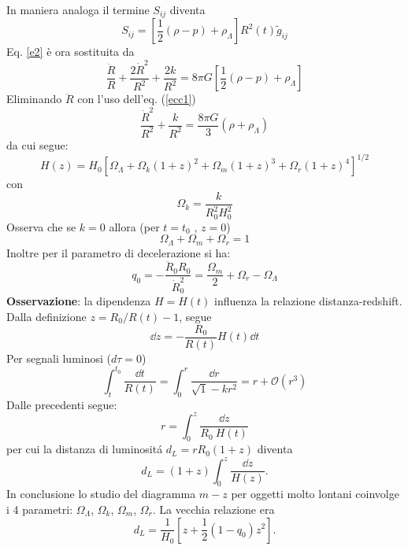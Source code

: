 In maniera analoga il termine $S_{ij}$ diventa
\begin{equation}
  S_{ij}= \left[ \frac {1}{2}(\rho-p)  + \rho_{\Lambda} \right] R^2(t) \tilde{g}_{ij}
  \label{sijcc}
\end{equation}
Eq. \eqref{e2}  è ora sostituita da
\begin{equation}
  \frac {\ddot{R}}{R}+\frac{2\dot{R}^2}{R^2}+\frac{2k}{R^2}=
  8 \pi G \left[ \frac{1}{2}(\rho-p) +\rho_{\Lambda} \right]
\end{equation}
Eliminando $\ddot R$ con l'uso dell'eq. (\ref{ecc1})
\begin{equation}
  \frac  {\dot{R}^2} {R^2} +\frac {k}{R^2} = \frac {8 \pi G}{3} (\rho+\rho_{\Lambda})
\end{equation}
da cui segue:
\begin{equation}
  H(z)=H_0 \left[\Omega_{\Lambda}+\Omega_{k}(1+z)^2+\Omega_m (1+z)^3+\Omega_r (1+z)^4\right]^{1/2}
  \label{hzcc}
\end{equation}
con
\begin{equation}
  \Omega_k = \frac {k}{R_0^2 H_0^2}
\end{equation}
Osserva che se $k=0$ allora (per $t=t_0$ , $z=0$)
\begin{equation}
  \Omega_{\Lambda} + \Omega_m  + \Omega_r = 1
\end{equation}
Inoltre per il parametro di decelerazione si ha:
\begin{equation}
  q_0= -\frac {\ddot R_0 R_0}{\dot R_0^2} = \frac{\Omega_m}{2} + \Omega_r -\Omega_{\Lambda}
  \label{q0cc}
\end{equation}
{\bf Osservazione}: la dipendenza $H=H(t)$ influenza la relazione
distanza-redshift.  Dalla definizione $z=R_0/R(t) -1$, segue
\begin{equation}
  \dd z = -\frac {R_0}{R(t)} H(t) \dd t
\end{equation}
Per segnali luminosi ($d \tau=0$)
\begin{equation}
  \int_t^{t_0} \frac {\dd t}{R(t)}= \int_0^{r} \frac {\dd r}{\sqrt1-kr^2} = r +
  \mathcal{O}(r^3)
\end{equation}
Dalle precedenti segue:
\begin{equation}
  r= \int_0^z \frac{\dd z}{R_0 ~ H(t)}
\end{equation}
per cui la distanza di luminosit\'a $d_L= r R_0 (1+z)$ diventa
\begin{equation}
  d_L = (1+z) \int_0^z \frac{\dd z}{H(z)}.
\end{equation}
In conclusione lo studio del diagramma $m-z$ per oggetti molto lontani coinvolge
i 4 parametri: $\Omega_{\Lambda}$, $\Omega_{k}$, $\Omega_{m}$, $\Omega_{r}$.  La
vecchia relazione era
\begin{equation}
  d_L = \frac {1}{H_0} \left[ z+ \frac{1}{2}(1-q_0)z^2\right].
\end{equation}

